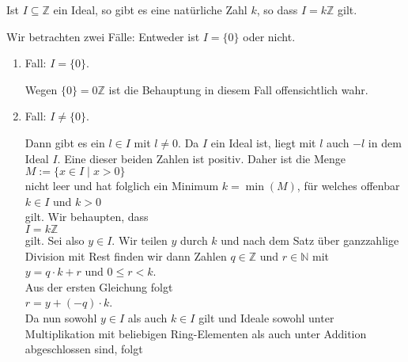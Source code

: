 \begin{Satz} \lb
Ist $I \subseteq \mathbb{Z}$ ein Ideal, so gibt es eine nat\"{u}rliche Zahl $k$, so dass $I = k\mathbb{Z}$
gilt.
\end{Satz}

\proof
Wir betrachten zwei F\"{a}lle:  Entweder ist $I = \{0\}$ oder nicht.
\begin{enumerate}
\item Fall: $I = \{ 0 \}$.

      Wegen $\{ 0 \} = 0\mathbb{Z}$ ist die Behauptung in diesem Fall offensichtlich
      wahr.
\item Fall: $I \not= \{ 0 \}$.

      Dann gibt es ein $l \in I$ mit $l \not= 0$.  Da $I$ ein Ideal ist, liegt mit $l$ auch $-l$ in dem
      Ideal $I$.  Eine dieser beiden Zahlen ist positiv.  Daher ist die Menge
      \\[0.2cm]
      \hspace*{1.3cm}
      $M := \{ x \in I \mid x > 0 \}$
      \\[0.2cm]
      nicht leer und hat folglich ein Minimum $k = \min(M)$, f\"{u}r welches offenbar
      \\[0.2cm]
      \hspace*{1.3cm}
      $k \in I$ \quad und \quad $k > 0$
      \\[0.2cm]
      gilt.  Wir behaupten, dass
      \\[0.2cm]
      \hspace*{1.3cm}
      $I = k\mathbb{Z}$
      \\[0.2cm]
      gilt.  Sei also $y \in I$.  Wir teilen $y$ durch $k$ und  nach dem Satz
      \"{u}ber ganzzahlige Division mit Rest finden wir dann Zahlen $q \in \mathbb{Z}$ und $r \in \mathbb{N}$ mit
      \\[0.2cm]
      \hspace*{1.3cm}
      $y = q \cdot k + r$ \quad und \quad $0 \leq r < k$.
      \\[0.2cm]
      Aus der ersten Gleichung folgt
      \\[0.2cm]
      \hspace*{1.3cm}
      $r = y + (-q) \cdot k$.
      \\[0.2cm]
      Da nun sowohl $y \in I$ als auch $k \in I$ gilt und Ideale sowohl unter Multiplikation mit
      beliebigen Ring-Elementen als auch unter Addition abgeschlossen sind, folgt
      \\[0.2cm]
      \hspace*{1.3cm}

\end{enumerate}
